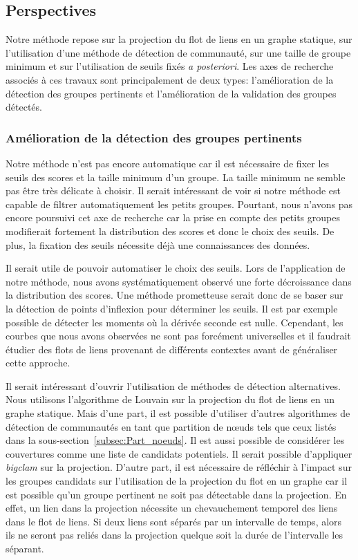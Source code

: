 \subsection{Perspectives}

Notre méthode repose sur la projection du flot de liens en un graphe statique, sur l'utilisation d'une méthode de détection de communauté, sur une taille de groupe minimum et sur l'utilisation de seuils fixés \emph{a posteriori}.
Les axes de recherche associés à ces travaux sont principalement de deux types: l'amélioration de la détection des groupes pertinents et l'amélioration de la validation des groupes détectés.

\subsubsection{Amélioration de la détection des groupes pertinents}
Notre méthode n'est pas encore automatique car il est nécessaire de fixer les seuils des scores et la taille minimum d'un groupe.
La taille minimum ne semble pas être très délicate à choisir.
Il serait intéressant de voir si notre méthode est capable de filtrer automatiquement les petits groupes.
Pourtant, nous n'avons pas encore poursuivi cet axe de recherche car la prise en compte des petits groupes modifierait fortement la distribution des scores et donc le choix des seuils.
De plus, la fixation des seuils nécessite déjà une connaissances des données.

Il serait utile de pouvoir automatiser le choix des seuils.
Lors de l'application de notre méthode, nous avons systématiquement observé une forte décroissance dans la distribution des scores.
Une méthode prometteuse serait donc de se baser sur la détection de points d'inflexion pour déterminer les seuils.
Il est par exemple possible de détecter les moments où la dérivée seconde est nulle.
Cependant, les courbes que nous avons observées ne sont pas forcément universelles et il faudrait étudier des flots de liens provenant de différents contextes avant de généraliser cette approche.


Il serait intéressant d'ouvrir l'utilisation de méthodes de détection alternatives.
Nous utilisons l'algorithme de Louvain sur la projection du flot de liens en un graphe statique.
Mais d'une part, il est possible d'utiliser d'autres algorithmes de détection de communautés en tant que partition de n\oe{}uds tels que ceux listés dans la sous-section~\ref{subsec:Part_noeuds}.
Il est aussi possible de considérer les couvertures comme une liste de candidats potentiels.
Il serait possible d'appliquer \emph{bigclam} sur la projection.
D'autre part, il est nécessaire de réfléchir à l'impact sur les groupes candidats sur l'utilisation de la projection du flot en un graphe car il est possible qu'un groupe pertinent ne soit pas détectable dans la projection.
En effet, un lien dans la projection nécessite un chevauchement temporel des liens dans le flot de liens.
Si deux liens sont séparés par un intervalle de temps, alors ils ne seront pas reliés dans la projection quelque soit la durée de l'intervalle les séparant.


